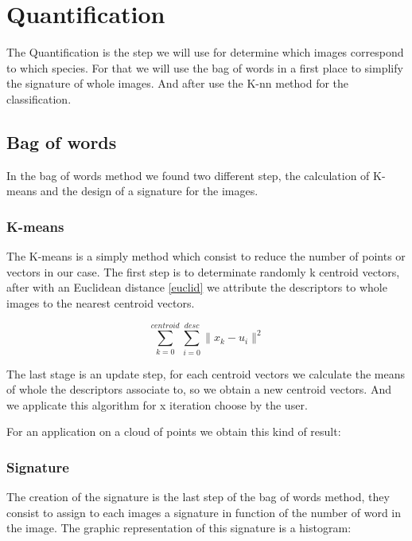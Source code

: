 \documentclass[12pt]{article}
\begin{document}
\section{Quantification}

The Quantification is the step we will use for determine which images correspond to which species. For that we will use the bag of words in a first place to simplify the signature of whole images. And after use the K-nn method for the classification.

\subsection{Bag of words}

In the bag of words method we found two different step, the calculation of K-means and the design of a signature for the images.

\subsubsection{K-means}

The K-means is a simply method which consist to reduce the number of points or vectors in our case. The first step is to determinate randomly k centroid vectors, after with an Euclidean distance \eqref{euclid} we attribute the descriptors to whole images to the nearest centroid vectors.

\begin{equation}
\sum_{k=0}^{centroid}\sum_{i=0}^{desc}\parallel x_k - u_i \parallel ^2
\label{euclid}
\end{equation}

The last stage is an update step, for each centroid vectors we calculate the means of whole the descriptors associate to, so we obtain a new centroid vectors. And we applicate this algorithm for x iteration choose by the user.

For an application on a cloud of points we obtain this kind of result:



\subsubsection{Signature}

The creation of the signature is the last step of the bag of words method, they consist to assign to each images a signature in function of the number of word in the image. The graphic representation of this signature is a histogram: 
\end{document}
